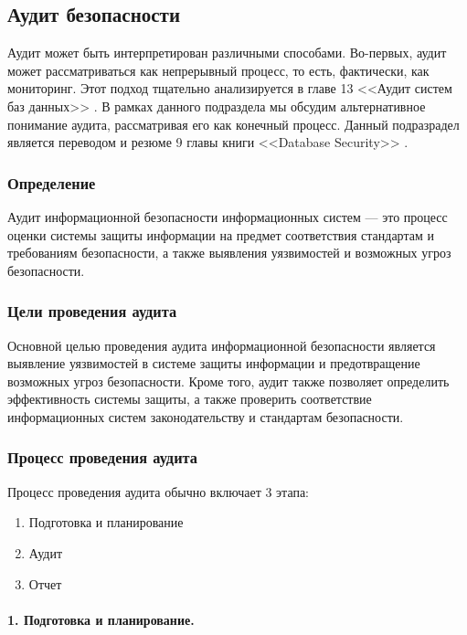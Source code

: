 \subsection{Аудит безопасности}

Аудит может быть интерпретирован различными способами. Во-первых, аудит может рассматриваться как непрерывный процесс, то есть, фактически, как мониторинг. Этот подход тщательно анализируется в главе 13 <<Аудит систем баз данных>> \autocite{Smirnov2007}.
В рамках данного подраздела мы обсудим альтернативное понимание аудита, рассматривая его как конечный процесс. Данный подразрадел является переводом и резюме 9 главы книги <<Database Security>> \autocite{DatabaseSecurity}.

\subsubsection{Определение}

Аудит информационной безопасности информационных систем — это процесс оценки системы защиты информации на предмет соответствия стандартам и требованиям безопасности, а также выявления уязвимостей и возможных угроз безопасности.

\subsubsection{Цели проведения аудита}

Основной целью проведения аудита информационной безопасности является выявление уязвимостей в системе защиты информации и предотвращение возможных угроз безопасности. Кроме того, аудит также позволяет определить эффективность системы защиты, а также проверить соответствие информационных систем законодательству и стандартам безопасности.

\subsubsection{Процесс проведения аудита}

Процесс проведения аудита обычно включает 3 этапа:
\begin{enumerate}
	\item Подготовка и планирование
	\item Аудит
	\item Отчет
\end{enumerate}

\paragraph{1. Подготовка и планирование.}

